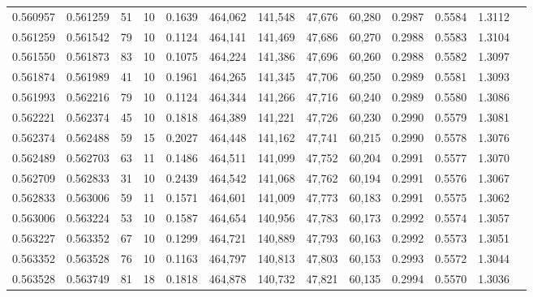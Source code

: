 \begin{tabular}{rrrrrrrrrrrrr}
0.560957 & 0.561259 &    51 &  10 &                                     0.1639 & 464,062 & 141,548 &  47,676 &  60,280 & 0.2987 & 0.5584 & 1.3112 \\
0.561259 & 0.561542 &    79 &  10 &                                     0.1124 & 464,141 & 141,469 &  47,686 &  60,270 & 0.2988 & 0.5583 & 1.3104 \\
0.561550 & 0.561873 &    83 &  10 &                                     0.1075 & 464,224 & 141,386 &  47,696 &  60,260 & 0.2988 & 0.5582 & 1.3097 \\
0.561874 & 0.561989 &    41 &  10 &                                     0.1961 & 464,265 & 141,345 &  47,706 &  60,250 & 0.2989 & 0.5581 & 1.3093 \\
0.561993 & 0.562216 &    79 &  10 &                                     0.1124 & 464,344 & 141,266 &  47,716 &  60,240 & 0.2989 & 0.5580 & 1.3086 \\
0.562221 & 0.562374 &    45 &  10 &                                     0.1818 & 464,389 & 141,221 &  47,726 &  60,230 & 0.2990 & 0.5579 & 1.3081 \\
0.562374 & 0.562488 &    59 &  15 &                                     0.2027 & 464,448 & 141,162 &  47,741 &  60,215 & 0.2990 & 0.5578 & 1.3076 \\
0.562489 & 0.562703 &    63 &  11 &                                     0.1486 & 464,511 & 141,099 &  47,752 &  60,204 & 0.2991 & 0.5577 & 1.3070 \\
0.562709 & 0.562833 &    31 &  10 &                                     0.2439 & 464,542 & 141,068 &  47,762 &  60,194 & 0.2991 & 0.5576 & 1.3067 \\
0.562833 & 0.563006 &    59 &  11 &                                     0.1571 & 464,601 & 141,009 &  47,773 &  60,183 & 0.2991 & 0.5575 & 1.3062 \\
0.563006 & 0.563224 &    53 &  10 &                                     0.1587 & 464,654 & 140,956 &  47,783 &  60,173 & 0.2992 & 0.5574 & 1.3057 \\
0.563227 & 0.563352 &    67 &  10 &                                     0.1299 & 464,721 & 140,889 &  47,793 &  60,163 & 0.2992 & 0.5573 & 1.3051 \\
0.563352 & 0.563528 &    76 &  10 &                                     0.1163 & 464,797 & 140,813 &  47,803 &  60,153 & 0.2993 & 0.5572 & 1.3044 \\
0.563528 & 0.563749 &    81 &  18 &                                     0.1818 & 464,878 & 140,732 &  47,821 &  60,135 & 0.2994 & 0.5570 & 1.3036 \\

\end{tabular}
